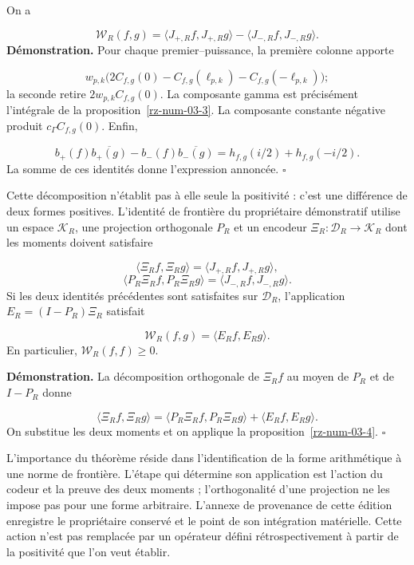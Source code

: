 On a

\[
\mathscr W_R(f,g)
=\langle J_{+,R}f,J_{+,R}g\rangle
-\langle J_{-,R}f,J_{-,R}g\rangle.
\]
\textbf{Démonstration.} Pour chaque premier–puissance, la première colonne apporte

\[
w_{p,k}\bigl(2C_{f,g}(0)
-C_{f,g}(\ell_{p,k})-C_{f,g}(-\ell_{p,k})\bigr);
\]
la seconde retire \(2w_{p,k}C_{f,g}(0)\). La composante gamma est précisément l'intégrale de la proposition~\ref{rz-num-03-3}. La composante constante négative produit \(c_\Gamma C_{f,g}(0)\). Enfin,

\[
b_+(f)\overline{b_+(g)}-b_-(f)\overline{b_-(g)}
=h_{f,g}(i/2)+h_{f,g}(-i/2).
\]
La somme de ces identités donne l’expression annoncée. \hfill\(\square\)

Cette décomposition n’établit pas à elle seule la positivité : c’est une différence de deux formes positives. L’identité de frontière du propriétaire démonstratif utilise un espace \(\mathcal K_R\), une projection orthogonale \(P_R\) et un encodeur \(\Xi_R:\mathcal D_R\to\mathcal K_R\) dont les moments doivent satisfaire

\[
\langle\Xi_Rf,\Xi_Rg\rangle
=\langle J_{+,R}f,J_{+,R}g\rangle,
\]
\[
\langle P_R\Xi_Rf,P_R\Xi_Rg\rangle
=\langle J_{-,R}f,J_{-,R}g\rangle.
\]
Si les deux identités précédentes sont satisfaites sur \(\mathcal D_R\), l'application \(E_R=(I-P_R)\Xi_R\) satisfait

\[
\mathscr W_R(f,g)=\langle E_Rf,E_Rg\rangle.
\]
En particulier, \(\mathscr W_R(f,f)\geq0\).

\textbf{Démonstration.} La décomposition orthogonale de \(\Xi_Rf\) au moyen de \(P_R\) et de \(I-P_R\) donne

\[
\langle\Xi_Rf,\Xi_Rg\rangle
=\langle P_R\Xi_Rf,P_R\Xi_Rg\rangle
+\langle E_Rf,E_Rg\rangle.
\]
On substitue les deux moments et on applique la proposition~\ref{rz-num-03-4}. \hfill\(\square\)

L'importance du théorème réside dans l'identification de la forme arithmétique à une norme de frontière. L'étape qui détermine son application est l'action du codeur et la preuve des deux moments ; l'orthogonalité d'une projection ne les impose pas pour une forme arbitraire. L'annexe de provenance de cette édition enregistre le propriétaire conservé et le point de son intégration matérielle. Cette action n'est pas remplacée par un opérateur défini rétrospectivement à partir de la positivité que l'on veut établir.

